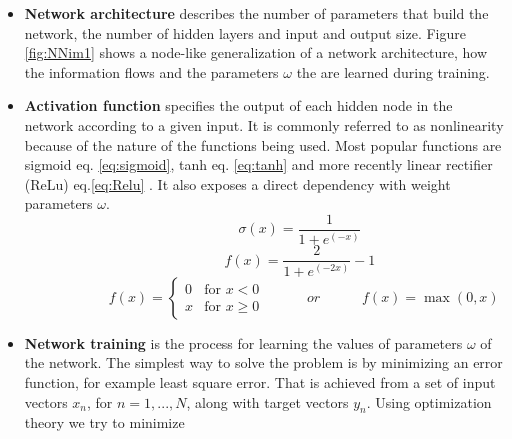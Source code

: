 \begin{itemize}
\item \textbf{Network architecture} describes the number of parameters that build the network, the number of hidden layers and input and output size. Figure \ref{fig:NNim1} shows a node-like generalization of a network architecture, how the information flows and the parameters $\omega$ the are learned during training.  
\item \textbf{Activation function} specifies the output of each hidden node in the network according to a given input. It is commonly referred to as nonlinearity because of the nature of the functions being used. Most popular functions are sigmoid eq. \ref{eq:sigmoid}, tanh eq. \ref{eq:tanh} and more recently linear rectifier (ReLu) eq.\ref{eq:Relu} \cite{glorot2011deep}. It also exposes a direct dependency with weight parameters $\omega$. 
\begin{equation} \label{eq:sigmoid}
\hspace{3em} \hspace{3em} \hspace{3em} \sigma (x) = \frac{1}{1+e^{(-x)}} \enspace \enspace \hspace{3em}
\end{equation} 
\begin{equation} \label{eq:tanh}
\hspace{3em} \hspace{3em} \hspace{3em} f (x) = \frac{2}{1+e^{(-2x)}}-1 \enspace \enspace \hspace{3em}
\end{equation} 
\begin{equation} \label{eq:Relu}
\hspace{3em} \hspace{3em} f (x) = \begin{cases} 0 & \text{for } x < 0 \\ x & \text{for } x \geqslant 0    \end{cases} \hspace{3em} or \hspace{3em} f (x) = \max (0,x) \hspace{3em}
\end{equation} 
\item \textbf{Network training} is the process for learning the values of parameters $\omega$ of the network. The simplest way to solve the problem is by minimizing an error function, for example least square error. That is achieved from a set of input vectors $x_n$, for $n = 1,...,N$, along with target vectors $y_n$. Using optimization theory we try to minimize 

\end{itemize}
